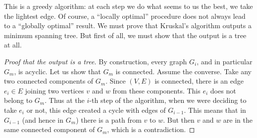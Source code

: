 

\setcounter{section}{2}
\setcounter{subsection}{6}
\setcounter{dfn}{18}

This is a greedy algorithm: at each step we do what seems to us the best, we take the lightest edge.
Of course, a ``locally optimal'' procedure does not always lead to a ``globally optimal'' result.
We must prove that Kruskal's algorithm outputs a minimum spanning tree.
But first of all, we must show that the output is a tree at all.

\begin{proof}[Proof that the output is a tree]
By construction, every graph $G_i$, and in particular $G_m$, is acyclic.
Let us show that $G_m$ is connected.
Assume the converse.
Take any two connected components of $G_m$.
Since $(V, E)$ is connected, there is an edge $e_i \in E$ joining two vertices $v$ and $w$ from these components.
This $e_i$ does not belong to $G_m$.
Thus at the $i$-th step of the algorithm, when we were deciding to take $e_i$ or not,
this edge created a cycle with edges of $G_{i-1}$.
This means that in $G_{i-1}$ (and hence in $G_m$) there is a path from $v$ to $w$.
But then $v$ and $w$ are in the same connected component of $G_m$, which is a contradiction.
\end{proof}

